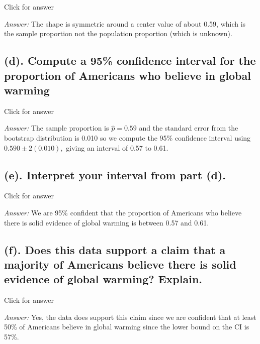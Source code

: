 \documentclass[
]{book}
\begin{document}
Click for answer

\emph{Answer:} The shape is symmetric around a center value of about 0.59, which is the sample proportion not the population proportion (which is unknown).

\hypertarget{d.-compute-a-95-confidence-interval-for-the-proportion-of-americans-who-believe-in-global-warming}{%
\subsection{(d). Compute a 95\% confidence interval for the proportion of Americans who believe in global warming}\label{d.-compute-a-95-confidence-interval-for-the-proportion-of-americans-who-believe-in-global-warming}}

Click for answer

\emph{Answer:} The sample proportion is \(\hat{p} = 0.59\) and the standard error from the bootstrap distribution is 0.010 so we compute the 95\% confidence interval using \(0.590 \pm 2(0.010),\) giving an interval of 0.57 to 0.61.

\hypertarget{e.-interpret-your-interval-from-part-d.}{%
\subsection{(e). Interpret your interval from part (d).}\label{e.-interpret-your-interval-from-part-d.}}

Click for answer

\emph{Answer:} We are 95\% confident that the proportion of Americans who believe there is solid evidence of global warming is between 0.57 and 0.61.

\hypertarget{f.-does-this-data-support-a-claim-that-a-majority-of-americans-believe-there-is-solid-evidence-of-global-warming-explain.}{%
\subsection{(f). Does this data support a claim that a majority of Americans believe there is solid evidence of global warming? Explain.}\label{f.-does-this-data-support-a-claim-that-a-majority-of-americans-believe-there-is-solid-evidence-of-global-warming-explain.}}

Click for answer

\emph{Answer:} Yes, the data does support this claim since we are confident that at least 50\% of Americans believe in global warming since the lower bound on the CI is 57\%.
\end{document}
